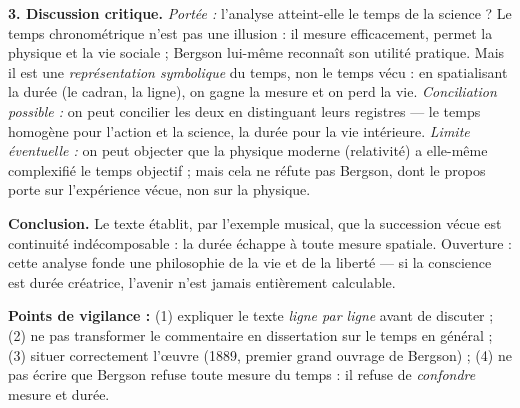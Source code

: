 \documentclass[11pt]{article}
\begin{document}
\begin{corrige}
\textbf{3. Discussion critique.} \emph{Portée :} l'analyse atteint-elle le temps de la science ? Le temps chronométrique n'est pas une illusion : il mesure efficacement, permet la physique et la vie sociale ; Bergson lui-même reconnaît son utilité pratique. Mais il est une \emph{représentation symbolique} du temps, non le temps vécu : en spatialisant la durée (le cadran, la ligne), on gagne la mesure et on perd la vie. \emph{Conciliation possible :} on peut concilier les deux en distinguant leurs registres — le temps homogène pour l'action et la science, la durée pour la vie intérieure. \emph{Limite éventuelle :} on peut objecter que la physique moderne (relativité) a elle-même complexifié le temps objectif ; mais cela ne réfute pas Bergson, dont le propos porte sur l'expérience vécue, non sur la physique.

\textbf{Conclusion.} Le texte établit, par l'exemple musical, que la succession vécue est continuité indécomposable : la durée échappe à toute mesure spatiale. Ouverture : cette analyse fonde une philosophie de la vie et de la liberté — si la conscience est durée créatrice, l'avenir n'est jamais entièrement calculable.

\textbf{Points de vigilance :} (1) expliquer le texte \emph{ligne par ligne} avant de discuter ; (2) ne pas transformer le commentaire en dissertation sur le temps en général ; (3) situer correctement l'œuvre (1889, premier grand ouvrage de Bergson) ; (4) ne pas écrire que Bergson refuse toute mesure du temps : il refuse de \emph{confondre} mesure et durée.
\end{corrige}
\end{document}
